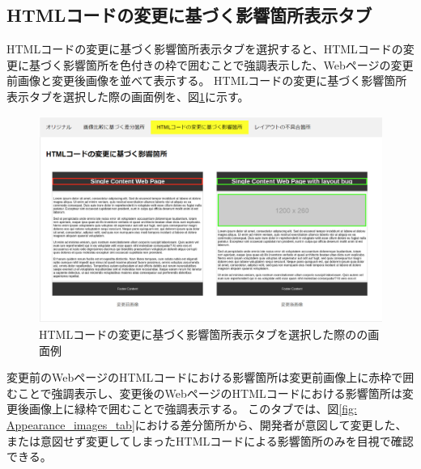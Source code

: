\subsection{HTMLコードの変更に基づく影響箇所表示タブ}\label{subsec:html_tab}
HTMLコードの変更に基づく影響箇所表示タブを選択すると、HTMLコードの変更に基づく影響箇所を色付きの枠で囲むことで強調表示した、Webページの変更前画像と変更後画像を並べて表示する。
HTMLコードの変更に基づく影響箇所表示タブを選択した際の画面例を、図\ref{fig: Appearance_html_tab}に示す。
\begin{figure}[tp]
    \begin{center}
        \includegraphics[width=1.0\columnwidth]{image/3_html_tab2.png}
        \caption{HTMLコードの変更に基づく影響箇所表示タブを選択した際の\toolName の画面例}
        \label{fig: Appearance_html_tab}
    \end{center}
\end{figure}
変更前のWebページのHTMLコードにおける影響箇所は変更前画像上に赤枠で囲むことで強調表示し、変更後のWebページのHTMLコードにおける影響箇所は変更後画像上に緑枠で囲むことで強調表示する。
このタブでは、図\ref{fig: Appearance_images_tab}における差分箇所から、開発者が意図して変更した、または意図せず変更してしまったHTMLコードによる影響箇所のみを目視で確認できる。

